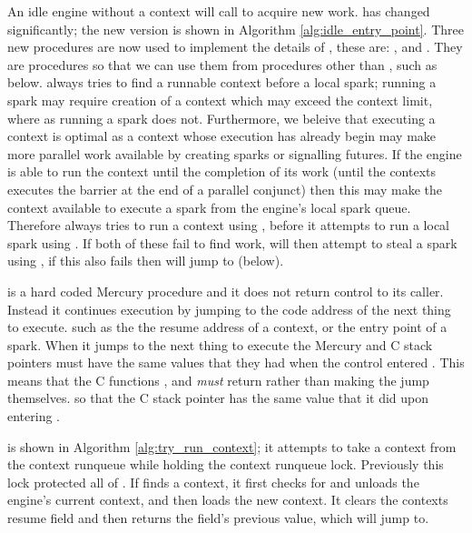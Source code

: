 An idle engine without a context will call \idle to acquire new work.
\idle has changed significantly;
the new version is shown in Algorithm \ref{alg:idle_entry_point}.
Three new procedures are now used to implement the details of \idle, these
are:
\tryruncontext, \tryrunlocalspark and \trystealspark.
They are procedures so that we can use them from procedures other than
\idle, such as \joinandcontinue below.
\idle always tries to find a runnable context before a local spark;
running a spark may require creation of a context which may exceed the
context limit,
where as running a spark does not.
Furthermore,
we beleive that executing a context is optimal
as a context whose execution has already begin may make more parallel work
available by creating sparks or signalling futures.
If the engine is able to run the context until the completion of its work
(until the contexts executes the \joinandcontinue barrier at the end of a
parallel conjunct)
then this may make the context available to execute a spark from the
engine's local spark queue.
Therefore \idle always tries to run a context using \tryruncontext,
before it attempts to run a local spark using \tryrunlocalspark.
If both of these fail to find work, \idle will then attempt to steal a spark using
\trystealspark,
if this also fails then \idle will jump to \sleep (below).

\idle is a hard coded Mercury procedure and it does not return control to
its caller.
Instead it continues execution by jumping to the code address of the next
thing to execute.
such as the
the resume address of a context,
or the entry point of a spark.
When it jumps to the next thing to execute the Mercury and C stack pointers
must have the same values that they had when the control entered \idle.
This means that the C functions \tryruncontext, \tryrunlocalspark and
\trystealspark \emph{must} return
rather than making the jump themselves.
so that the C stack pointer has the same value that it did upon entering
\idle.

\tryruncontext is shown in Algorithm \ref{alg:try_run_context};
it attempts to take a context from the context runqueue while holding the
context runqueue lock.
Previously this lock protected all of \idle.
If \tryruncontext finds a context,
it first checks for and unloads the engine's current context,
and then loads the new context.
It clears the contexts resume field and then returns the field's previous
value, which \idle will jump to.

